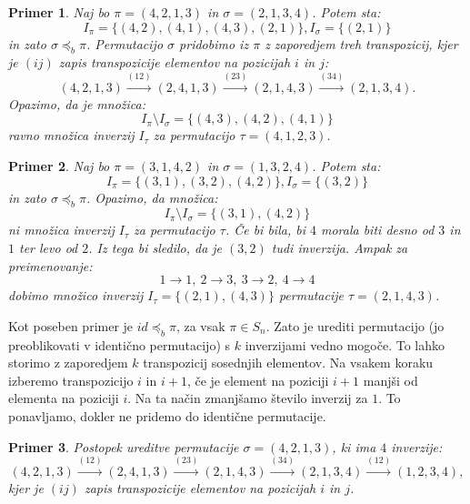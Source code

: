 \documentclass[a4paper, 12pt]{book}
\newtheorem{primer}{Primer}[chapter]
\begin{document}
\begin{primer}
    Naj bo $\pi = (4, 2, 1, 3)$ in $\sigma = (2, 1, 3, 4)$. Potem sta:
    \[I_{\pi} = \{ (4, 2), (4, 1), (4, 3), (2, 1) \}, I_{\sigma} = \{ (2, 1) \}\]
    in zato $\sigma \preceq_b \pi$. Permutacijo $\sigma$ pridobimo iz $\pi$ z zaporedjem treh transpozicij, kjer je $(ij)$ zapis transpozicije elementov na pozicijah $i$ in $j$:
    \[
        (4, 2, 1, 3) \overset{(12)}{\rightarrow} (2, 4, 1, 3) \overset{(23)}{\rightarrow} (2, 1, 4, 3) \overset{(34)}{\rightarrow} (2, 1, 3, 4).
    \]
    Opazimo, da je množica:
    \[
        I_{\pi} \setminus I_{\sigma} = \{ (4, 3), (4, 2), (4, 1) \}
    \]
    ravno množica inverzij $I_{\tau}$ za permutacijo $\tau = (4, 1, 2, 3)$.
\end{primer}

\begin{primer}
\label{primer_preimenovanje_elementov_mnozice_inverzij}
    Naj bo $\pi = (3, 1, 4, 2)$ in $\sigma = (1, 3, 2, 4)$. Potem sta:
    \[I_{\pi} = \{ (3, 1), (3, 2), (4, 2) \}, I_{\sigma} = \{ (3, 2) \}\]
    in zato $\sigma \preceq_b \pi$. Opazimo, da množica:
    \[
        I_{\pi} \setminus I_{\sigma} = \{ (3, 1), (4, 2) \}
    \]
    ni množica inverzij $I_{\tau}$ za permutacijo $\tau$. Če bi bila, bi $4$ morala biti desno od $3$ in $1$ ter levo od $2$. Iz tega bi sledilo, da je $(3, 2)$ tudi inverzija. Ampak za preimenovanje:
    \[
        1 \rightarrow 1, \ 2 \rightarrow 3, \ 3 \rightarrow 2, \ 4 \rightarrow 4 
    \]
    dobimo množico inverzij $I_{\tau} = \{ (2, 1), (4, 3)\}$ permutacije $\tau = (2, 1, 4, 3)$.
\end{primer}

Kot poseben primer je $id \preceq_b \pi$, za vsak $\pi \in S_n$. Zato je urediti permutacijo (jo preoblikovati v identično permutacijo) s $k$ inverzijami vedno mogoče. To lahko storimo z zaporedjem $k$ transpozicij sosednjih elementov. Na vsakem koraku izberemo transpozicijo $i$ in $i+1$, če je element na poziciji $i+1$ manjši od elementa na poziciji $i$. Na ta način zmanjšamo število inverzij za $1$. To ponavljamo, dokler ne pridemo do identične permutacije.

\begin{primer}
    Postopek ureditve permutacije $\sigma = (4, 2, 1, 3)$, ki ima $4$ inverzije: 
    \[
        (4, 2, 1, 3) \overset{(12)}{\rightarrow} (2, 4, 1, 3) \overset{(23)}{\rightarrow} (2, 1, 4, 3) \overset{(34)}{\rightarrow} (2, 1, 3, 4) \overset{(12)}{\rightarrow} (1, 2, 3, 4),
    \]
    kjer je $(i j)$ zapis transpozicije elementov na pozicijah $i$ in $j$.
\end{primer}
\end{document}

